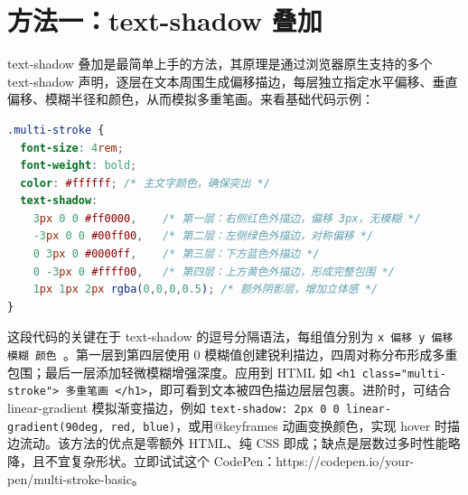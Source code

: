 \section{方法一：text-shadow 叠加}
text-shadow 叠加是最简单上手的方法，其原理是通过浏览器原生支持的多个 text-shadow 声明，逐层在文本周围生成偏移描边，每层独立指定水平偏移、垂直偏移、模糊半径和颜色，从而模拟多重笔画。来看基础代码示例：\par
\begin{lstlisting}[language=css]
.multi-stroke {
  font-size: 4rem;
  font-weight: bold;
  color: #ffffff; /* 主文字颜色，确保突出 */
  text-shadow:
    3px 0 0 #ff0000,    /* 第一层：右侧红色外描边，偏移 3px，无模糊 */
    -3px 0 0 #00ff00,   /* 第二层：左侧绿色外描边，对称偏移 */
    0 3px 0 #0000ff,    /* 第三层：下方蓝色外描边 */
    0 -3px 0 #ffff00,   /* 第四层：上方黄色外描边，形成完整包围 */
    1px 1px 2px rgba(0,0,0,0.5); /* 额外阴影层，增加立体感 */
}
\end{lstlisting}
这段代码的关键在于 text-shadow 的逗号分隔语法，每组值分别为 \texttt{x 偏移 y 偏移 模糊 颜色 }。第一层到第四层使用 0 模糊值创建锐利描边，四周对称分布形成多重包围；最后一层添加轻微模糊增强深度。应用到 HTML 如 \texttt{<h1 class="multi-stroke"> 多重笔画 </h1>}，即可看到文本被四色描边层层包裹。进阶时，可结合 linear-gradient 模拟渐变描边，例如 \texttt{text-shadow: 2px 0 0 linear-gradient(90deg, red, blue)}，或用@keyframes 动画变换颜色，实现 hover 时描边流动。该方法的优点是零额外 HTML、纯 CSS 即成；缺点是层数过多时性能略降，且不宜复杂形状。立即试试这个 CodePen：https://codepen.io/your-pen/multi-stroke-basic。\par
